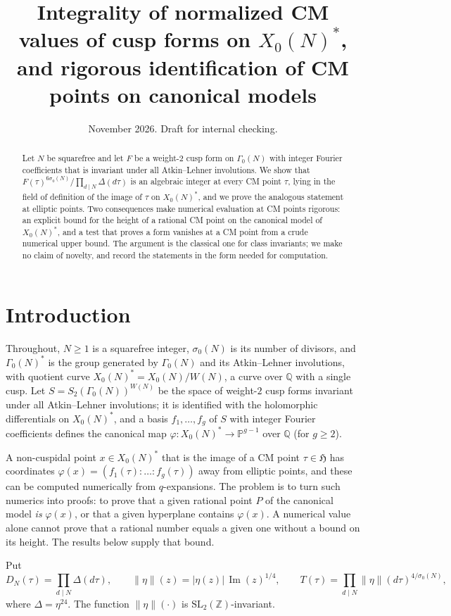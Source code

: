 \documentclass[11pt]{amsart}
\title[Integrality of CM values on $X_0(N)^*$]{Integrality of normalized CM values of cusp forms on $X_0(N)^*$, and rigorous identification of CM points on canonical models}
\date{November 2026. Draft for internal checking.}
\theoremstyle{definition}
\theoremstyle{remark}
\newcommand{\Z}{\mathbb{Z}}
\newcommand{\Q}{\mathbb{Q}}
\newcommand{\HH}{\mathfrak{H}}
\newcommand{\SL}{\mathrm{SL}}
\newcommand{\im}{\operatorname{Im}}
\newcommand{\sz}{\sigma_0}
\newcommand{\Xs}{X_0(N)^*}
\newcommand{\Gs}{\Gamma_0(N)^*}
\newcommand{\etanorm}[1]{\lVert\eta\rVert(#1)}
\begin{document}
\begin{abstract}
Let $N$ be squarefree and let $F$ be a weight-$2$ cusp form on $\Gamma_0(N)$ with
integer Fourier coefficients that is invariant under all Atkin--Lehner
involutions.  We show that
$F(\tau)^{6\sz(N)}/\prod_{d\mid N}\Delta(d\tau)$ is an algebraic integer at every
CM point $\tau$, lying in the field of definition of the image of $\tau$ on
$\Xs$, and we prove the analogous statement at elliptic points.  Two consequences
make numerical evaluation at CM points rigorous: an explicit bound for the height
of a rational CM point on the canonical model of $\Xs$, and a test that proves a
form vanishes at a CM point from a crude numerical upper bound.  The argument is
the classical one for class invariants; we make no claim of novelty, and record
the statements in the form needed for computation.
\end{abstract}
\maketitle

\section{Introduction}

Throughout, $N\ge1$ is a squarefree integer, $\sz(N)$ is its number of divisors,
and $\Gs$ is the group generated by $\Gamma_0(N)$ and its Atkin--Lehner
involutions, with quotient curve $\Xs=X_0(N)/W(N)$, a curve over $\Q$ with a single
cusp.  Let $S=S_2(\Gamma_0(N))^{W(N)}$ be the space of weight-$2$ cusp forms
invariant under all Atkin--Lehner involutions; it is identified with the
holomorphic differentials on $\Xs$, and a basis $f_1,\dots,f_g$ of $S$ with
integer Fourier coefficients defines the canonical map
$\varphi\colon\Xs\to\mathbb P^{g-1}$ over $\Q$ (for $g\ge2$).

A non-cuspidal point $x\in\Xs$ that is the image of a CM point $\tau\in\HH$ has
coordinates $\varphi(x)=(f_1(\tau):\dots:f_g(\tau))$ away from elliptic points,
and these can be computed numerically from $q$-expansions.  The problem is to
turn such numerics into proofs: to prove that a given rational point $P$ of the
canonical model \emph{is} $\varphi(x)$, or that a given hyperplane contains
$\varphi(x)$.  A numerical value alone cannot prove that a rational number
equals a given one without a bound on its height.  The results below supply
that bound.

Put
\[
D_N(\tau)=\prod_{d\mid N}\Delta(d\tau),\qquad
\etanorm{z}=\lvert\eta(z)\rvert\,\im(z)^{1/4},\qquad
T(\tau)=\prod_{d\mid N}\etanorm{d\tau}^{4/\sz(N)} ,
\]
where $\Delta=\eta^{24}$.  The function $\etanorm{\cdot}$ is
$\SL_2(\Z)$-invariant.
\end{document}
